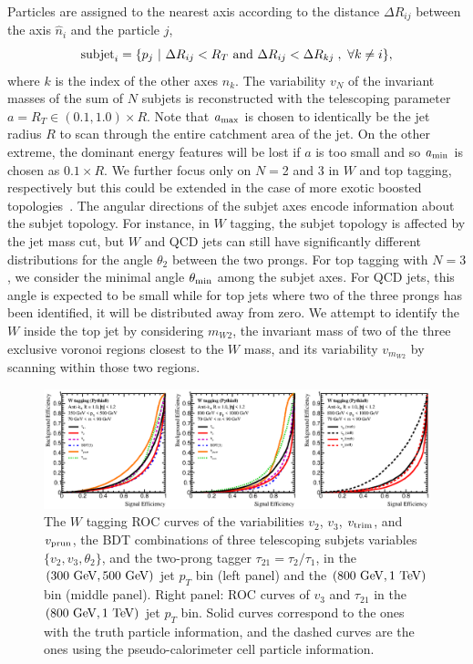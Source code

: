 \documentclass[aps,prl,floatfix,preprintnumbers,twocolumn,groupedaddress,nofootinbib]{revtex4-1}
\begin{document}
Particles are assigned to the nearest axis according to the distance $\Delta R_{ij}$ between the axis $\hat n_i$ and the particle $j$,
\begin{equation}
    {\rm subjet}_{i} = \{p_j~|~\Delta R_{ij}<R_T~{\rm and}~\Delta R_{ij}<\Delta R_{kj}\;,~\forall k\neq i\},
\end{equation}
where $k$ is the index of the other axes $\hat n_k$. The variability $v_N$ of the invariant masses of the sum of $N$ subjets is reconstructed with the telescoping parameter $a = R_{T}\in (0.1, 1.0)\times R$. Note that $a_{\rm max}$ is chosen to identically be the jet radius $R$ to scan through the entire catchment area of the jet. On the other extreme, the dominant energy features will be lost if $a$ is too small and so $a_{\rm min}$ is chosen as $0.1\times R$. We further focus only on $N = $2 and 3 in $W$ and top tagging, respectively but this could be extended in the case of more exotic boosted topologies~\cite{Bai:2010dj}. The angular directions of the subjet axes encode information about the subjet topology. For instance, in $W$ tagging, the subjet topology is affected by the jet mass cut, but $W$ and QCD jets can still have significantly different distributions for the angle $\theta_2$ between the two prongs. For top tagging with $N=3$, we consider the minimal angle $\theta_{\rm min}$ among the subjet axes. For QCD jets, this angle is expected to be small while for top jets where two of the three prongs has been identified, it will be distributed away from zero. We attempt to identify the $W$ inside the top jet \cite{Thaler:2008ju,Kaplan:2008ie} by considering $m_{W2}$, the invariant mass of two of the three exclusive voronoi regions closest to the $W$ mass, and its variability $v_{m_{W2}}$ by scanning within those two regions.
\newline

\begin{figure}
    \includegraphics[width=2\columnwidth]{plots/W_ROCs_5.eps}
    \caption{The $W$ tagging ROC curves of the variabilities $v_2$, $v_3$, $v_{\rm trim}$, and $v_{\rm prun}$,
    the BDT combinations of three telescoping subjets variables $\{v_2, v_3, \theta_2\}$, and the two-prong tagger $\tau_{21}=\tau_{2}/\tau_{1}$, in the $(300~{\rm GeV}, 500~{\rm GeV})$ jet $p_T$ bin (left panel) and the $(800~{\rm GeV}, 1~{\rm TeV})$ bin (middle panel). Right panel: ROC curves of $v_3$ and $\tau_{21}$ in the $(800~{\rm GeV}, 1~{\rm TeV})$ jet $p_T$ bin. Solid curves correspond to the ones with the truth particle information, and the dashed curves are the ones using the pseudo-calorimeter cell particle information.}
\label{ROC_W}
\end{figure}
\end{document}
